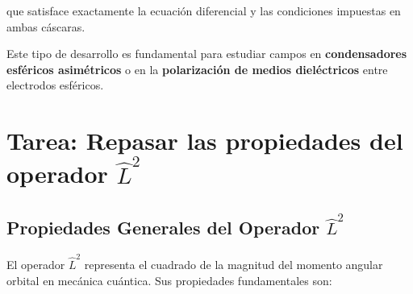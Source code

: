 \documentclass[a4paper]{article}
\begin{document}
que satisface exactamente la ecuación diferencial y las condiciones impuestas en ambas cáscaras.

Este tipo de desarrollo es fundamental para estudiar campos en \textbf{condensadores esféricos asimétricos} o en la \textbf{polarización de medios dieléctricos} entre electrodos esféricos.


\section{Tarea: Repasar las propiedades del operador $\hat{L}^2$}

\subsection{Propiedades Generales del Operador $\hat{L}^2$}

El operador $\hat{L}^2$ representa el cuadrado de la magnitud del momento angular orbital en mecánica cuántica. Sus propiedades fundamentales son:
\end{document}
